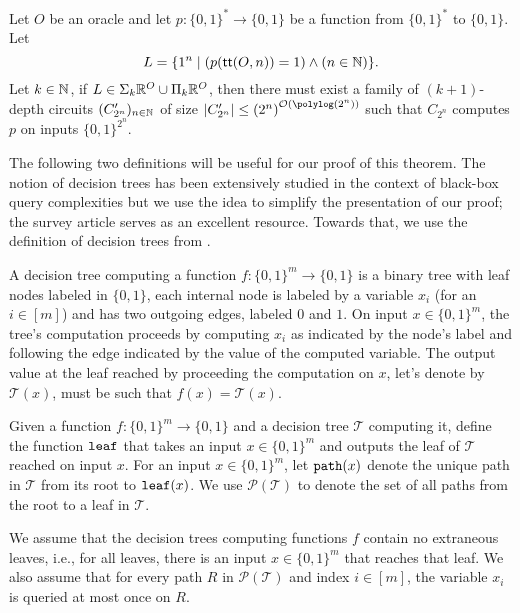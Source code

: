 \documentclass{article}
\begin{document}
\begin{theorem} 
\label{thm:CircuitLowerBoundsImplyNoMembershipInRPH}
Let $O$ be an oracle and let $p:\{0,1\}^* \rightarrow \{0,1\}$ be a function from $\{0, 1\}^*$ to $\{ 0, 1\}$. Let 
\[L=\{1^n \mid (p(\textsf{tt}(O,n)) =1) \land (n \in \mathbb{N}) \}.\]
Let $k \in \mathbb{N}$, if $L \in \Sigma_{k}\mathbb{R}^O \cup \Pi_{k}\mathbb{R}^O$, then there must exist a family of $(k+1)$-depth circuits $(C'_{2^n})_{n \in \mathbb{N}}$ of size $|C'_{2^n}| \leq {(2^n)}^{\bigO(\polylog(2^n))}$ such that $C_{2^n}$ computes $p$ on inputs $\{0,1\}^{2^n}$.
\end{theorem}

The following two definitions will be useful for our proof of this theorem. The notion of decision trees has been extensively studied in the context of black-box query complexities but we use the idea to simplify the presentation of our proof; the survey article \cite{BW02} serves as an excellent resource. Towards that, we use the definition of decision trees from \cite{CMP22}.

\begin{definition}
\label{def:decisionTrees}
A decision tree computing a function $f : \{0,1\}^m \rightarrow \{0,1\}$ is a binary tree with leaf nodes labeled in $\{0,1\}$, each internal node is labeled by a variable $x_i$ (for an $i \in [m]$) and has two outgoing edges, labeled $0$ and $1$. On input $x \in \{0,1\}^m$, the tree’s computation proceeds by computing $x_i$ as indicated by the node’s label and following the edge indicated by the value of the computed variable. The output value at the leaf reached by proceeding the computation on $x$, let's denote by $\mathcal{T}(x)$, must be such that $f(x)=\mathcal{T}(x)$. 

Given a function  $f : \{0,1\}^m \rightarrow \{0,1\}$ and a decision tree $\mathcal{T}$ computing it, define the function $\texttt{leaf}$ that takes an input $x \in \{0,1\}^m$ and outputs the leaf of $\mathcal{T}$ reached on input $x$. For an input $x \in \{0,1\}^m$, let $\texttt{path}(x)$ denote the unique path in $\mathcal{T}$ from its root to $\texttt{leaf}(x)$. We use $\mathcal{P}(\mathcal{T})$ to denote the set of all paths from the root to a leaf in $\mathcal{T}$.

We assume that the decision trees computing functions $f$ contain no extraneous leaves, i.e., for all leaves, there is an input $x \in \{0,1\}^m$ that reaches that leaf. We also assume that for every path $R$ in $\mathcal{P}(\mathcal{T})$ and index $i \in [m]$, the variable $x_i$ is queried at most once on $R$.
\end{definition}
\end{document}
